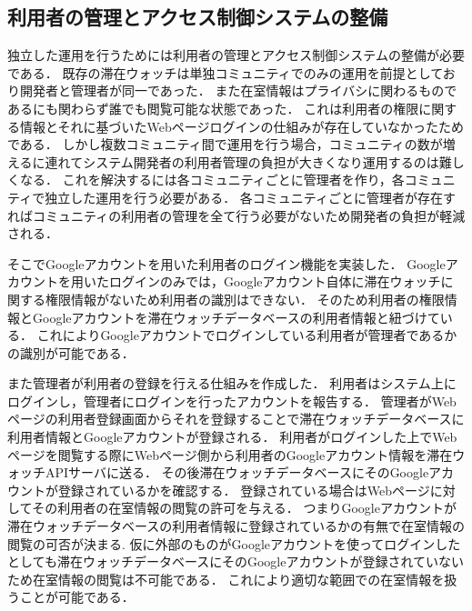 
\subsection{利用者の管理とアクセス制御システムの整備}
独立した運用を行うためには利用者の管理とアクセス制御システムの整備が必要である．
既存の滞在ウォッチは単独コミュニティでのみの運用を前提としており開発者と管理者が同一であった．
また在室情報はプライバシに関わるものであるにも関わらず誰でも閲覧可能な状態であった．
これは利用者の権限に関する情報とそれに基づいたWebページログインの仕組みが存在していなかったためである．
しかし複数コミュニティ間で運用を行う場合，コミュニティの数が増えるに連れてシステム開発者の利用者管理の負担が大きくなり運用するのは難しくなる．
これを解決するには各コミュニティごとに管理者を作り，各コミュニティで独立した運用を行う必要がある．
各コミュニティごとに管理者が存在すればコミュニティの利用者の管理を全て行う必要がないため開発者の負担が軽減される．

そこでGoogleアカウントを用いた利用者のログイン機能を実装した．
Googleアカウントを用いたログインのみでは，Googleアカウント自体に滞在ウォッチに関する権限情報がないため利用者の識別はできない．
そのため利用者の権限情報とGoogleアカウントを滞在ウォッチデータベースの利用者情報と紐づけている．
これによりGoogleアカウントでログインしている利用者が管理者であるかの識別が可能である．

また管理者が利用者の登録を行える仕組みを作成した．
利用者はシステム上にログインし，管理者にログインを行ったアカウントを報告する．
管理者がWebページの利用者登録画面からそれを登録することで滞在ウォッチデータベースに利用者情報とGoogleアカウントが登録される．
利用者がログインした上でWebページを閲覧する際にWebページ側から利用者のGoogleアカウント情報を滞在ウォッチAPIサーバに送る．
その後滞在ウォッチデータベースにそのGoogleアカウントが登録されているかを確認する．
登録されている場合はWebページに対してその利用者の在室情報の閲覧の許可を与える．
つまりGoogleアカウントが滞在ウォッチデータベースの利用者情報に登録されているかの有無で在室情報の閲覧の可否が決まる.
仮に外部のものがGoogleアカウントを使ってログインしたとしても滞在ウォッチデータベースにそのGoogleアカウントが登録されていないため在室情報の閲覧は不可能である．
これにより適切な範囲での在室情報を扱うことが可能である．